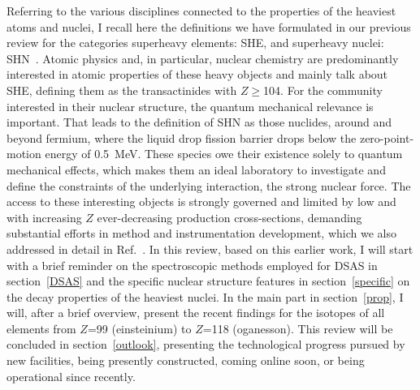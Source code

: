 Referring to the various disciplines connected to the properties of the heaviest atoms and nuclei, I recall here the definitions we have formulated in our previous review for the categories superheavy elements: SHE, and superheavy nuclei: SHN~\cite{Ackermann2017}. 
Atomic physics and, in particular, nuclear chemistry are predominantly interested in atomic properties of these heavy objects and mainly talk about SHE, defining them as the transactinides with $Z\geq$104.
For the community interested in their nuclear structure, the quantum mechanical relevance is important.
That leads to the definition of SHN as those nuclides, around and beyond fermium, where the liquid drop fission barrier drops below the zero-point-motion energy of 0.5~MeV. 
These species owe their existence solely to quantum mechanical effects, which makes them an ideal laboratory to investigate and define the constraints of the underlying interaction, the strong nuclear force.  
The access to these interesting objects is strongly governed and limited by low and with increasing $Z$ ever-decreasing production cross-sections, demanding substantial efforts in method and instrumentation development, which we also addressed in detail in Ref.~\cite{Ackermann2017}. 
In this review, based on this earlier work, I will start with a brief reminder on the spectroscopic methods employed for DSAS in section~\ref{DSAS} and the specific nuclear structure features in section~\ref{specific} on the decay properties of the heaviest nuclei. 
In the main part in section~\ref{prop}, I will, after a brief overview, present the recent findings for the isotopes of all elements from $Z$=99 (einsteinium) to $Z$=118 (oganesson).
This review will be concluded in section~\ref{outlook}, presenting the technological progress pursued by new facilities, being presently constructed, coming online soon, or being operational since recently.









